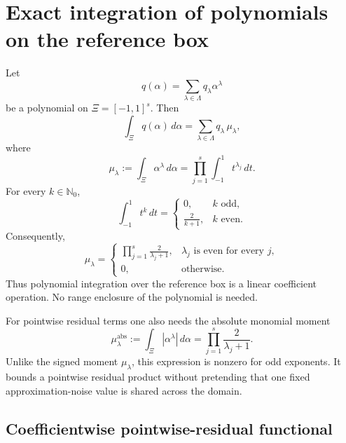\documentclass[11pt]{article}
\newcommand{\N}{\mathbb{N}}
\newcommand{\abs}[1]{\left\lvert #1\right\rvert}
\begin{document}
\section{Exact integration of polynomials on the reference box}

Let
\[
    q(\alpha)=\sum_{\lambda\in\Lambda} q_\lambda\alpha^\lambda
\]
be a polynomial on \(\Xi=[-1,1]^s\). Then
\begin{equation}
    \int_\Xi q(\alpha)\,d\alpha
    =
    \sum_{\lambda\in\Lambda} q_\lambda\,\mu_\lambda,
    \label{eq:box-polynomial-integration}
\end{equation}
where
\begin{equation}
    \mu_\lambda
    :=
    \int_\Xi \alpha^\lambda\,d\alpha
    =
    \prod_{j=1}^s\int_{-1}^1 t^{\lambda_j}\,dt.
    \label{eq:box-moment}
\end{equation}
For every \(k\in\N_0\),
\begin{equation}
    \int_{-1}^1 t^k\,dt
    =
    \begin{cases}
        0, & k\text{ odd},\\[1mm]
        \displaystyle\frac{2}{k+1}, & k\text{ even}.
    \end{cases}
    \label{eq:one-dimensional-moment}
\end{equation}
Consequently,
\begin{equation}
    \mu_\lambda
    =
    \begin{cases}
        \displaystyle\prod_{j=1}^s \frac{2}{\lambda_j+1},
        & \lambda_j\text{ is even for every }j,\\[3mm]
        0, & \text{otherwise}.
    \end{cases}
    \label{eq:multivariate-moment}
\end{equation}
Thus polynomial integration over the reference box is a linear coefficient operation. No range enclosure of the polynomial is needed.

For pointwise residual terms one also needs the absolute monomial moment
\begin{equation}
    \mu^{\mathrm{abs}}_\lambda
    :=\int_\Xi\abs{\alpha^\lambda}\,d\alpha
    =\prod_{j=1}^s\frac{2}{\lambda_j+1}.
    \label{eq:absolute-box-moment}
\end{equation}
Unlike the signed moment \(\mu_\lambda\), this expression is nonzero for odd
exponents.  It bounds a pointwise residual product without pretending that
one fixed approximation-noise value is shared across the domain.

\subsection{Coefficientwise pointwise-residual functional}
\end{document}
